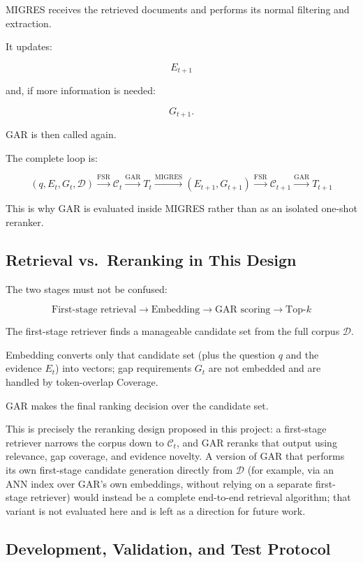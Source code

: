 \documentclass[11pt,a4paper]{article}
\begin{document}
MIGRES receives the retrieved documents and performs its normal filtering and extraction.

It updates:

\[
E_{t+1}
\]

and, if more information is needed:

\[
G_{t+1}.
\]

GAR is then called again.

The complete loop is:

\[
\boxed{
(q,E_t,G_t,\mathcal{D})
\xrightarrow{\mathrm{FSR}}
\mathcal{C}_t
\xrightarrow{\mathrm{GAR}}
T_t
\xrightarrow{\mathrm{MIGRES}}
(E_{t+1},G_{t+1})
\xrightarrow{\mathrm{FSR}}
\mathcal{C}_{t+1}
\xrightarrow{\mathrm{GAR}}
T_{t+1}
}
\]

This is why GAR is evaluated inside MIGRES rather than as an isolated one-shot reranker.

\subsection{Retrieval vs.\ Reranking in This Design}

The two stages must not be confused:

\[
\boxed{
\text{First-stage retrieval}
\rightarrow
\text{Embedding}
\rightarrow
\text{GAR scoring}
\rightarrow
\text{Top-}k
}
\]

The first-stage retriever finds a manageable candidate set from the full corpus $\mathcal{D}$.

Embedding converts only that candidate set (plus the question $q$ and the evidence $E_t$) into vectors; gap requirements $G_t$ are not embedded and are handled by token-overlap Coverage.

GAR makes the final ranking decision over the candidate set.

This is precisely the reranking design proposed in this project: a first-stage retriever narrows the corpus down to $\mathcal{C}_t$, and GAR reranks that output using relevance, gap coverage, and evidence novelty. A version of GAR that performs its own first-stage candidate generation directly from $\mathcal{D}$ (for example, via an ANN index over GAR's own embeddings, without relying on a separate first-stage retriever) would instead be a complete end-to-end retrieval algorithm; that variant is not evaluated here and is left as a direction for future work.

\subsection{Development, Validation, and Test Protocol}
\end{document}
